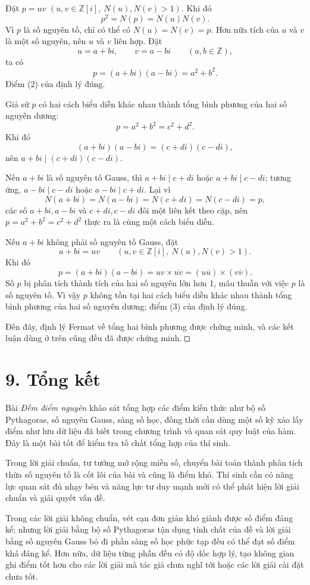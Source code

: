 \documentclass[11pt]{article}
\newcommand{\square}{\mathord{\vcenter{\hrule height .5pt
  \hbox{\vrule width .5pt height 5pt\kern5pt\vrule width .5pt}
  \hrule height .5pt}}}
\begin{document}
Đặt \(p=uv\) \((u,v\in\mathbb Z[i],\ N(u),N(v)>1)\). Khi đó
\[
  p^2=N(p)=N(u)N(v).
\]
Vì \(p\) là số nguyên tố, chỉ có thể có \(N(u)=N(v)=p\). Hơn nữa tích của
\(u\) và \(v\) là một số nguyên, nên \(u\) và \(v\) liên hợp. Đặt
\[
  u=a+bi,\qquad v=a-bi\qquad (a,b\in\mathbb Z),
\]
ta có
\[
  p=(a+bi)(a-bi)=a^2+b^2.
\]
Điểm (2) của định lý đúng.

Giả sử \(p\) có hai cách biểu diễn khác nhau thành tổng bình phương của hai số
nguyên dương:
\[
  p=a^2+b^2=c^2+d^2.
\]
Khi đó
\[
  (a+bi)(a-bi)=(c+di)(c-di),
\]
nên \(a+bi\mid(c+di)(c-di)\).

Nếu \(a+bi\) là số nguyên tố Gauss, thì \(a+bi\mid c+di\) hoặc
\(a+bi\mid c-di\); tương ứng, \(a-bi\mid c-di\) hoặc \(a-bi\mid c+di\). Lại vì
\[
  N(a+bi)=N(a-bi)=N(c+di)=N(c-di)=p,
\]
các số \(a+bi,a-bi\) và \(c+di,c-di\) đôi một liên kết theo cặp, nên
\(p=a^2+b^2=c^2+d^2\) thực ra là cùng một cách biểu diễn.

Nếu \(a+bi\) không phải số nguyên tố Gauss, đặt
\[
  a+bi=uv\qquad (u,v\in\mathbb Z[i],\ N(u),N(v)>1).
\]
Khi đó
\[
  p=(a+bi)(a-bi)=uv\times\overline{uv}=(u\overline u)\times(v\overline v).
\]
Số \(p\) bị phân tích thành tích của hai số nguyên lớn hơn 1, mâu thuẫn với
việc \(p\) là số nguyên tố. Vì vậy \(p\) không tồn tại hai cách biểu diễn khác
nhau thành tổng bình phương của hai số nguyên dương; điểm (3) của định lý
đúng.

Đến đây, định lý Fermat về tổng hai bình phương được chứng minh, và các kết
luận dùng ở trên cũng đều đã được chứng minh. \(\square\)

\section*{9. Tổng kết}

Bài \emph{Đếm điểm nguyên} khảo sát tổng hợp các điểm kiến thức như bộ số
Pythagoras, số nguyên Gauss, sàng số học, đồng thời cần dùng một số kỹ xảo lấy
điểm như lưu dữ liệu đã biết trong chương trình và quan sát quy luật của hàm.
Đây là một bài tốt để kiểm tra tố chất tổng hợp của thí sinh.

Trong lời giải chuẩn, tư tưởng mở rộng miền số, chuyển bài toán thành phân
tích thừa số nguyên tố là cốt lõi của bài và cũng là điểm khó. Thí sinh cần có
năng lực quan sát đủ nhạy bén và năng lực tư duy mạnh mới có thể phát hiện lời
giải chuẩn và giải quyết vấn đề.

Trong các lời giải không chuẩn, vét cạn đơn giản khó giành được số điểm đáng
kể; nhưng lời giải bằng bộ số Pythagoras tận dụng tính chất của đề và lời giải
bằng số nguyên Gauss bỏ đi phần sàng số học phức tạp đều có thể đạt số điểm
khá đáng kể. Hơn nữa, dữ liệu từng phần đều có độ dốc hợp lý, tạo không gian
ghi điểm tốt hơn cho các lời giải mà tác giả chưa nghĩ tới hoặc các lời giải
cài đặt chưa tốt.
\end{document}
